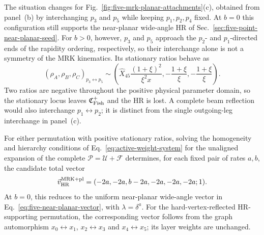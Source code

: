 \documentclass[a4paper,11pt]{article}
\newcommand{\vHR}{\vec v_{\rm HR}}
\begin{document}
The situation changes for Fig.~\ref{fig:five-mrk-planar-attachments}(c),
obtained from panel~(b) by interchanging \(p_3\) and \(p_5\) while keeping
\(p_1,p_2,p_4\) fixed.  At \(b=0\) this configuration still supports the
near-planar wide-angle HR of Sec.~\ref{sec:five-point-near-planar-seed}.
For \(b>0\), however, \(p_3\) and \(p_5\) approach the \(p_2\)- and
\(p_1\)-directed ends of the rapidity ordering, respectively, so their
interchange alone is not a symmetry of the MRK kinematics.  Its stationary
ratios behave as
\begin{equation}
 (\rho_A,\rho_B,\rho_C)_{p_3\leftrightarrow p_5}
 \sim\left(
 \widehat X_{45}\frac{(1+\xi)^2}{\xi^2x},
 -\frac{1+\xi}{\xi},
 -\frac{1+\xi}{\xi}\right).
 \label{eq:five-mrk-planar-p3-p5-negative-ratios}
\end{equation}
Two ratios are negative throughout the positive physical parameter domain,
so the stationary locus leaves \(\mathfrak C_{\rm Fish}^{+}\) and the HR is
lost.  A complete beam reflection would also interchange
\(p_1\leftrightarrow p_2\); it is distinct from the single outgoing-leg
interchange in panel~(c).

For either permutation with positive stationary ratios, solving the
homogeneity and hierarchy conditions of
Eq.~\eqref{eq:active-weight-system} for the unaligned expansion of the
complete \(\mathcal P=\mathcal U+\mathcal F\) determines, for each fixed
pair of rates \(a,b\), the candidate total vector
\begin{equation}
 \vHR^{\rm MRK+pl}=
 (-2a,-2a,b-2a,-2a,-2a,-2a;1).
 \label{eq:five-mrk-planar-vector}
\end{equation}
At \(b=0\), this reduces to the uniform near-planar wide-angle vector in
Eq.~\eqref{eq:five-near-planar-vector}, with \(\lambda=\delta^a\).
For the hard-vertex-reflected HR-supporting permutation, the corresponding
vector follows from the graph automorphism
\(x_0\leftrightarrow x_1\), \(x_2\leftrightarrow x_3\) and
\(x_4\leftrightarrow x_5\); its layer weights are unchanged.
\end{document}
